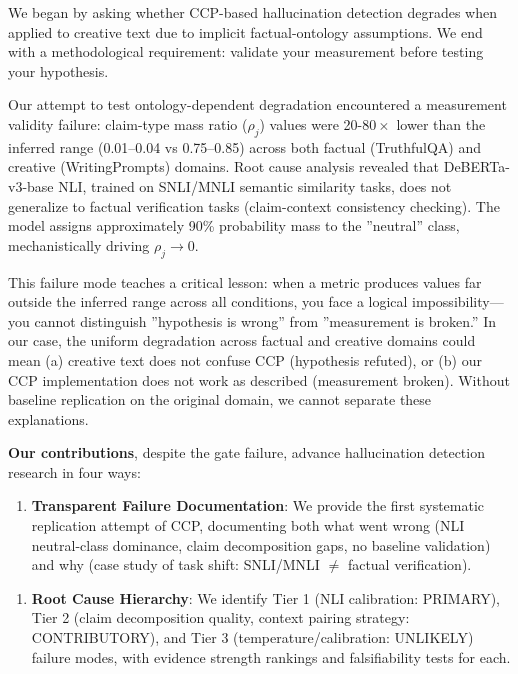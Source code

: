 
We began by asking whether CCP-based hallucination detection degrades when applied to creative text due to implicit factual-ontology assumptions. We end with a methodological requirement: validate your measurement before testing your hypothesis.

Our attempt to test ontology-dependent degradation encountered a measurement validity failure: claim-type mass ratio ($\rho_j$) values were 20-$80\times$ lower than the inferred range (0.01--0.04 vs 0.75--0.85) across both factual (TruthfulQA) and creative (WritingPrompts) domains. Root cause analysis revealed that DeBERTa-v3-base NLI, trained on SNLI/MNLI semantic similarity tasks, does not generalize to factual verification tasks (claim-context consistency checking). The model assigns approximately 90\% probability mass to the ''neutral'' class, mechanistically driving $\rho_j \to 0$.

This failure mode teaches a critical lesson: when a metric produces values far outside the inferred range across all conditions, you face a logical impossibility---you cannot distinguish ''hypothesis is wrong'' from ''measurement is broken.'' In our case, the uniform degradation across factual and creative domains could mean (a) creative text does not confuse CCP (hypothesis refuted), or (b) our CCP implementation does not work as described (measurement broken). Without baseline replication on the original domain, we cannot separate these explanations.

\textbf{Our contributions}, despite the gate failure, advance hallucination detection research in four ways:

\begin{enumerate}
\item \textbf{Transparent Failure Documentation}: We provide the first systematic replication attempt of CCP, documenting both what went wrong (NLI neutral-class dominance, claim decomposition gaps, no baseline validation) and why (case study of task shift: SNLI/MNLI $\neq$ factual verification).
\end{enumerate}

\begin{enumerate}
\item \textbf{Root Cause Hierarchy}: We identify Tier 1 (NLI calibration: PRIMARY), Tier 2 (claim decomposition quality, context pairing strategy: CONTRIBUTORY), and Tier 3 (temperature/calibration: UNLIKELY) failure modes, with evidence strength rankings and falsifiability tests for each.
\end{enumerate}

